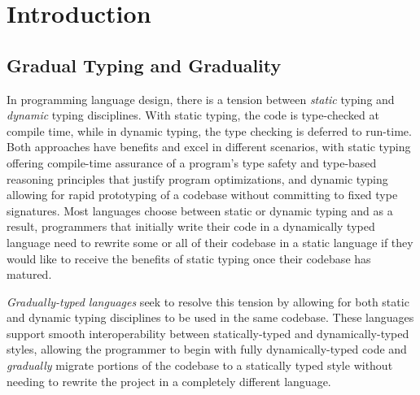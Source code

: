 \section{Introduction}
  
\subsection{Gradual Typing and Graduality}
In programming language design, there is a tension between \emph{static} typing
and \emph{dynamic} typing disciplines. With static typing, the code is
type-checked at compile time, while in dynamic typing, the type checking is
deferred to run-time. Both approaches have benefits and excel in different
scenarios, with static typing offering compile-time assurance of a program's
type safety and type-based reasoning principles that justify program
optimizations, and dynamic typing allowing for rapid prototyping of a codebase
without committing to fixed type signatures.
%
Most languages choose between static or dynamic typing and as a result,
programmers that initially write their code in a dynamically typed language need
to rewrite some or all of their codebase in a static language if they would like
to receive the benefits of static typing once their codebase has matured.

\emph{Gradually-typed languages} \cite{siek-taha06, tobin-hochstadt06} seek to
resolve this tension by allowing for both static and dynamic typing disciplines
to be used in the same codebase. These languages support smooth interoperability
between statically-typed and dynamically-typed styles, allowing the programmer to
begin with fully dynamically-typed code and \emph{gradually} migrate portions of the
codebase to a statically typed style without needing to rewrite the project in a
completely different language.



